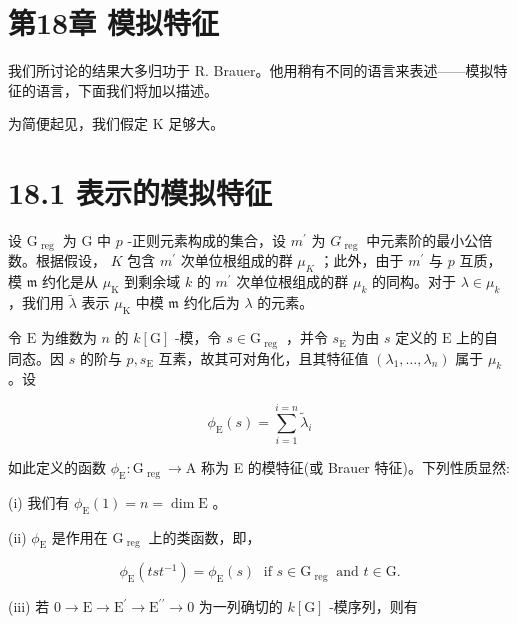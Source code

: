\documentclass[10pt]{article}
\begin{document}
\section*{第18章 模拟特征}

我们所讨论的结果大多归功于 R. Brauer。他用稍有不同的语言来表述——模拟特征的语言，下面我们将加以描述。

为简便起见，我们假定 \(\mathrm{K}\) 足够大。

\section*{18.1 表示的模拟特征}

设 \({\mathrm{G}}_{\text{ reg }}\) 为 \(\mathrm{G}\) 中 \(p\) -正则元素构成的集合，设 \({m}^{\prime }\) 为 \({G}_{\text{ reg }}\) 中元素阶的最小公倍数。根据假设， \(K\) 包含 \({m}^{\prime }\) 次单位根组成的群 \({\mu }_{K}\) ；此外，由于 \({m}^{\prime }\) 与 \(p\) 互质，模 \(\mathfrak{m}\) 约化是从 \({\mu }_{\mathrm{K}}\) 到剩余域 \(k\) 的 \({m}^{\prime }\) 次单位根组成的群 \({\mu }_{k}\) 的同构。对于 \(\lambda  \in  {\mu }_{k}\) ，我们用 \(\widetilde{\lambda }\) 表示 \({\mu }_{\mathrm{K}}\) 中模 \(\mathfrak{m}\) 约化后为 \(\lambda\) 的元素。

令 \(\mathrm{E}\) 为维数为 \(n\) 的 \(k\left\lbrack  \mathrm{G}\right\rbrack\) -模，令 \(s \in  {\mathrm{G}}_{\text{ reg }}\) ，并令 \({s}_{\mathrm{E}}\) 为由 \(s\) 定义的 \(\mathrm{E}\) 上的自同态。因 \(s\) 的阶与 \(p,{s}_{\mathrm{E}}\) 互素，故其可对角化，且其特征值 \(\left( {{\lambda }_{1},\ldots ,{\lambda }_{n}}\right)\) 属于 \({\mu }_{k}\) 。设

\[
{\phi }_{\mathrm{E}}\left( s\right)  = \mathop{\sum }\limits_{{i = 1}}^{{i = n}}{\widetilde{\lambda }}_{i}
\]

如此定义的函数 \({\phi }_{\mathrm{E}} : {\mathrm{G}}_{\text{ reg }} \rightarrow  \mathrm{A}\) 称为 E 的模特征(或 Brauer 特征)。下列性质显然:

(i) 我们有 \({\phi }_{\mathrm{E}}\left( 1\right)  = n = \dim \mathrm{E}\) 。

(ii) \({\phi }_{\mathrm{E}}\) 是作用在 \({\mathrm{G}}_{\text{ reg }}\) 上的类函数，即，

\[
{\phi }_{\mathrm{E}}\left( {{ts}{t}^{-1}}\right)  = {\phi }_{\mathrm{E}}\left( s\right) \;\text{ if }s \in  {\mathrm{G}}_{\text{ reg }}\text{ and }t \in  \mathrm{G}.
\]

(iii) 若 \(0 \rightarrow  \mathrm{E} \rightarrow  {\mathrm{E}}^{\prime } \rightarrow  {\mathrm{E}}^{\prime \prime } \rightarrow  0\) 为一列确切的 \(k\left\lbrack  \mathrm{G}\right\rbrack\) -模序列，则有
\end{document}
